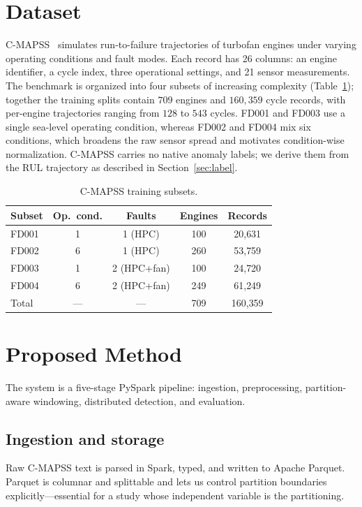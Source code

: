 \documentclass[conference]{IEEEtran}
\begin{document}
\section{Dataset}
C-MAPSS~\cite{saxena2008damage} simulates run-to-failure trajectories of turbofan engines under varying operating conditions and fault modes. Each record has 26 columns: an engine identifier, a cycle index, three operational settings, and 21 sensor measurements. The benchmark is organized into four subsets of increasing complexity (Table~\ref{tab:data}); together the training splits contain $709$ engines and $160{,}359$ cycle records, with per-engine trajectories ranging from $128$ to $543$ cycles. FD001 and FD003 use a single sea-level operating condition, whereas FD002 and FD004 mix six conditions, which broadens the raw sensor spread and motivates condition-wise normalization. C-MAPSS carries no native anomaly labels; we derive them from the RUL trajectory as described in Section~\ref{sec:label}.

\begin{table}[t]
\caption{C-MAPSS training subsets.}
\label{tab:data}
\centering
\small
\begin{tabular}{lcccc}
\toprule
Subset & Op.\ cond. & Faults & Engines & Records \\
\midrule
FD001 & 1 & 1 (HPC)       & 100 & 20{,}631 \\
FD002 & 6 & 1 (HPC)       & 260 & 53{,}759 \\
FD003 & 1 & 2 (HPC{+}fan) & 100 & 24{,}720 \\
FD004 & 6 & 2 (HPC{+}fan) & 249 & 61{,}249 \\
\midrule
Total & --- & --- & 709 & 160{,}359 \\
\bottomrule
\end{tabular}
\end{table}

\section{Proposed Method}
The system is a five-stage PySpark pipeline: ingestion, preprocessing, partition-aware windowing, distributed detection, and evaluation.

\subsection{Ingestion and storage}
Raw C-MAPSS text is parsed in Spark, typed, and written to Apache Parquet. Parquet is columnar and splittable and lets us control partition boundaries explicitly---essential for a study whose independent variable is the partitioning.
\end{document}

